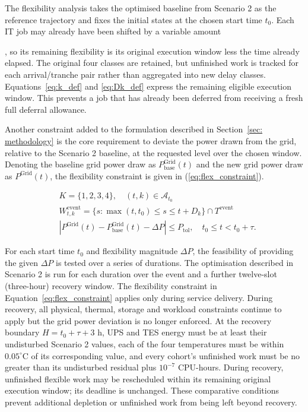 \documentclass[lettersize,journal]{IEEEtran}
\providecommand{\DIFadd}[1]{{\color{blue}#1}}
\providecommand{\DIFaddbegin}{}
\providecommand{\DIFaddend}{}
\begin{document}
The flexibility analysis takes the optimised baseline from Scenario  \DIFaddbegin \DIFadd{2 }\DIFaddend as the reference trajectory and fixes the initial states at the chosen start time $t_0$.  \DIFaddbegin \DIFadd{Each IT job may already have }\DIFaddend been shifted by a variable amount\DIFaddbegin \DIFadd{, so its remaining flexibility is its original execution window less the time already elapsed. The original four classes are retained, but unfinished work is tracked for each arrival/tranche pair rather than aggregated into new delay classes. Equations~\eqref{eq:k_def} and \eqref{eq:Dk_def} express the remaining eligible execution window. This prevents a job that has already been deferred from receiving a fresh full deferral allowance.

}\DIFaddend 

 \DIFaddbegin \DIFadd{Another constraint added }\DIFaddend to the formulation described in Section~\ref{sec: methodology}  is the core requirement to deviate the power drawn from the grid, relative to the Scenario 2 baseline, at the requested level over the chosen window. Denoting the baseline grid power draw as $P^{\mathrm{Grid}}_{\mathrm{base}}(t)$ and the new grid power draw as $P^{\mathrm{Grid}}(t)$, the flexibility constraint is given in (\ref{eq:flex_constraint}).

 \DIFaddbegin \begingroup\color{blue}
\begin{align}
& K=\{1,2,3,4\},\quad (t,k)\in\mathcal A_{t_0} \label{eq:k_def} \\
& W^{\mathrm{event}}_{t,k}=\{s:\max(t,t_0)\leq s\leq t+D_k\}\cap T^{\mathrm{event}} \label{eq:Dk_def} \\
& \left|P^{\mathrm{Grid}}(t)-P^{\mathrm{Grid}}_{\mathrm{base}}(t)-\Delta P\right|\leq P_{\mathrm{tol}},\quad t_0\leq t<t_0+\tau. \label{eq:flex_constraint}
\end{align}
\endgroup\DIFaddend 

For each start time $t_0$ and flexibility magnitude $\Delta P$, the feasibility of providing the given $\Delta P$ is tested over a series of durations. The optimisation described in Scenario 2 is run for each duration  \DIFaddbegin \DIFadd{over the event and a further twelve-slot (three-hour) recovery window}\DIFaddend . The flexibility  \DIFaddbegin \DIFadd{constraint in Equation~\eqref{eq:flex_constraint} applies only during service delivery. During recovery, all physical, thermal, storage and workload constraints continue to apply but the grid power deviation is no longer enforced. At the recovery boundary $H=t_0+\tau+3$ h, UPS and TES energy must be at least their undisturbed }\DIFaddend Scenario 2  \DIFaddbegin \DIFadd{values, each of the four temperatures must be within $0.05^\circ$C of its corresponding value, and every cohort's unfinished work must be no greater than its undisturbed residual plus $10^{-7}$ CPU-hours. During recovery, unfinished flexible work may be rescheduled within its remaining original execution window; its deadline is unchanged. These comparative conditions prevent additional depletion or unfinished work from being left beyond recovery}\DIFaddend .
\end{document}
